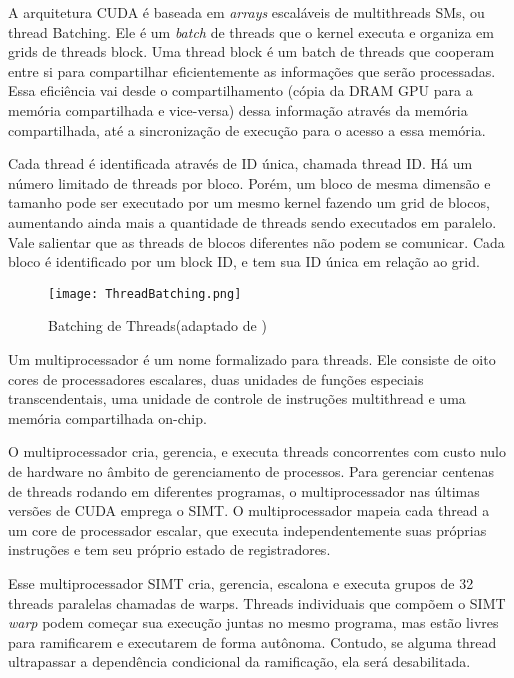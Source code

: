 A arquitetura CUDA é baseada em \textit{arrays} escaláveis de multithreads SMs, ou thread Batching. Ele é um \textit{batch} de threads que o kernel executa e organiza em grids de threads block. Uma thread block é um batch de threads que cooperam entre si para compartilhar eficientemente as informações que serão processadas. Essa eficiência vai desde o compartilhamento (cópia da DRAM GPU para a memória compartilhada e vice-versa) dessa informação através da memória compartilhada, até a sincronização de execução para o acesso a essa memória.

Cada thread é identificada através de ID única, chamada thread ID. Há um número limitado de threads por bloco. Porém, um bloco de mesma dimensão e tamanho pode ser executado por um mesmo kernel fazendo um grid de blocos, aumentando ainda mais a quantidade de threads sendo executados em paralelo. Vale salientar que as threads de blocos diferentes não podem se comunicar.
Cada bloco é identificado por um block ID, e tem sua ID única em relação ao grid.

\begin{figure}[!htb]
	\begin{center}
	\centering
			\texttt{[image: ThreadBatching.png]}
	\label{fig: ThreadBatching}
	\caption{Batching de Threads(adaptado de \cite{cuda})}
	\end{center}
\end{figure}

Um multiprocessador é um nome formalizado para threads. Ele consiste de oito cores de processadores escalares, duas unidades de funções especiais transcendentais, uma unidade de controle de instruções multithread e uma memória compartilhada on-chip.

O multiprocessador cria, gerencia, e executa threads concorrentes com custo nulo de hardware no âmbito de gerenciamento de processos. Para gerenciar centenas de threads rodando em diferentes programas, o multiprocessador nas últimas versões de CUDA emprega o SIMT. O multiprocessador mapeia cada thread a um core de processador escalar, que executa independentemente suas próprias instruções e tem seu próprio estado de registradores.

Esse multiprocessador SIMT cria, gerencia, escalona e executa grupos de 32 threads paralelas chamadas de warps. Threads individuais que compõem o SIMT \textit{warp} podem começar sua execução juntas no mesmo programa, mas estão livres para ramificarem e executarem de forma autônoma. Contudo, se alguma thread ultrapassar a dependência condicional da ramificação, ela será desabilitada. 

